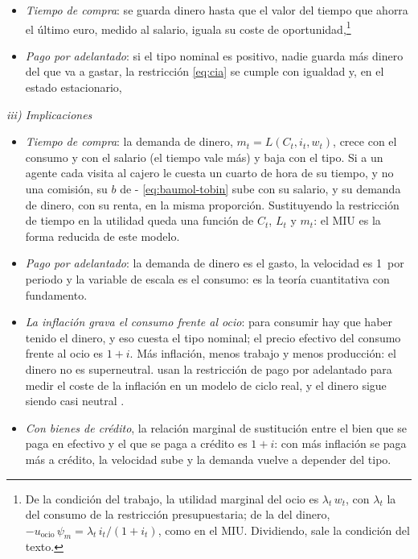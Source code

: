 \documentclass[11pt]{article}
\begin{document}
\begin{itemize}
\item \emph{Tiempo de compra}: se guarda dinero hasta que el valor del tiempo que ahorra el último euro, medido al salario, iguala su coste de oportunidad,\footnote{De la condición del trabajo, la utilidad marginal del ocio es $\lambda_t\,w_t$, con $\lambda_t$ la del consumo de la restricción presupuestaria; de la del dinero, $-u_{\text{ocio}}\,\psi_m=\lambda_t\,i_t/(1+i_t)$, como en el MIU. Dividiendo, sale la condición del texto\nocite{Walsh2017Monetary}.}
\item \emph{Pago por adelantado}: si el tipo nominal es positivo, nadie guarda más dinero del que va a gastar, la restricción \eqref{eq:cia} se cumple con igualdad y, en el estado estacionario,
\end{itemize}

\hspace*{3.6em}\emph{iii) Implicaciones}

\begin{itemize}
\item \emph{Tiempo de compra}: la demanda de dinero, $m_t=L(C_t,i_t,w_t)$, crece con el consumo y con el salario (el tiempo vale más) y baja con el tipo. Si a un agente cada visita al cajero le cuesta un cuarto de hora de su tiempo, y no una comisión, su $b$ de - \eqref{eq:baumol-tobin} sube con su salario, y su demanda de dinero, con su renta, en la misma proporción. Sustituyendo la restricción de tiempo en la utilidad queda una función de $C_t$, $L_t$ y $m_t$: el MIU es la forma reducida de este modelo\nocite{Feenstra1986Functional}.
\item \emph{Pago por adelantado}: la demanda de dinero es el gasto, la velocidad es 1~por periodo y la variable de escala es el consumo: es la teoría cuantitativa con fundamento.
\item \emph{La inflación grava el consumo frente al ocio}: para consumir hay que haber tenido el dinero, y eso cuesta el tipo nominal; el precio efectivo del consumo frente al ocio es $1+i$. Más inflación, menos trabajo y menos producción: el dinero no es superneutral. \textcite{CooleyHansen1989Inflation} usan la restricción de pago por adelantado para medir el coste de la inflación en un modelo de ciclo real, y el dinero sigue siendo casi neutral .
\item \emph{Con bienes de crédito}, la relación marginal de sustitución entre el bien que se paga en efectivo y el que se paga a crédito es $1+i$: con más inflación se paga más a crédito, la velocidad sube y la demanda vuelve a depender del tipo\nocite{LucasStokey1987Money}.
\end{itemize}
\end{document}

